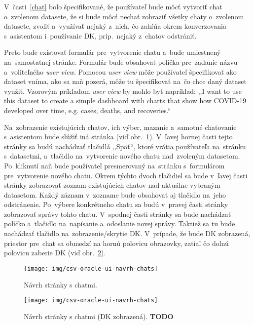 V~časti~\ref{chat} bolo špecifikované, že používateľ bude môcť vytvoriť chat o~zvolenom datasete, že si bude môcť nechať zobraziť všetky chaty o~zvolenom datasete, zvoliť a~využívať nejaký z~nich, čo zahŕňa okrem konverzovania s~asistentom i~používanie DK, príp.~nejaký z~chatov odstrániť.

Preto bude existovať formulár pre~vytvorenie chatu a~bude umiestnený na~samostatnej stránke. Formulár bude obsahovať políčka pre~zadanie názvu a~voliteľného \textit{user view}. Pomocou \textit{user view} môže používateľ špecifikovať ako dataset vníma, ako sa naň pozerá, môže tu špecifikovať na~čo chce daný dataset využiť. Vzorovým príkladom \textit{user view} by mohlo byť napríklad: ,,I want to use this dataset to create a simple dashboard with charts that show how COVID-19 developed over time, e.g. cases, deaths, and recoveries.``

Na~zobrazenie existujúcich chatov, ich výber, mazanie a~samotné chatovanie s~asistentom bude slúžiť iná stránka (viď obr.~\ref{csv-oracle-ui-navrh-chats}). V~ľavej hornej časti tejto stránky sa budú nachádzať tlačidlá ,,Späť``, ktoré vrátia používateľa na~stránku s~datasetmi, a~tlačidlo na~vytvorenie nového chatu nad~zvoleným datasetom. Po~kliknutí naň bude používateľ presmerovaný na~stránku s~formulárom pre~vytvorenie nového chatu. Okrem týchto dvoch tlačidiel sa bude v~ľavej časti stránky zobrazovať zoznam existujúcich chatov nad aktuálne vybraným datasetom. Každý záznam v~zozname bude obsahovať aj tlačidlo na~jeho odstránenie. Po~výbere konkrétneho chatu sa budú v~pravej časti stránky zobrazovať správy tohto chatu. V~spodnej časti stránky sa bude nachádzať políčko a~tlačidlo na~napísanie a~odoslanie novej správy. Taktiež sa tu bude nachádzať tlačidlo na~zobrazenie/skrytie DK. V~prípade, že bude DK zobrazená, priestor pre~chat sa obmedzí na hornú polovicu obrazovky, zatiaľ čo dolnú polovicu zaberie DK (viď obr.~\ref{csv-oracle-ui-navrh-chats-dk}).

\begin{figure}[H]\centering
\texttt{[image: img/csv-oracle-ui-navrh-chats]}
\caption{Návrh stránky s chatmi.}
\label{csv-oracle-ui-navrh-chats}
\end{figure}

\begin{figure}[H]\centering
\texttt{[image: img/csv-oracle-ui-navrh-chats]}
\caption{Návrh stránky s chatmi (DK zobrazená). \textbf{TODO}}
\label{csv-oracle-ui-navrh-chats-dk}
\end{figure}

